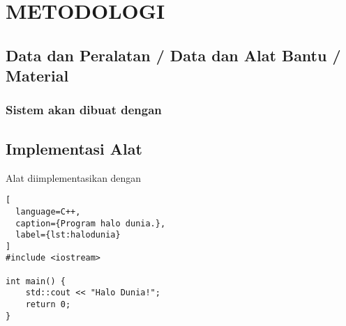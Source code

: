 \chapter{METODOLOGI}
\label{chap:desainimplementasi}



\section{Data dan Peralatan / Data dan Alat Bantu / Material}
\label{sec:perlengkapan}

\subsection{Sistem akan dibuat dengan \lipsum[1-2]}

\section{Implementasi Alat
\label{sec:implementasi alat}}

Alat diimplementasikan dengan \lipsum[1]

\begin{lstlisting}[
  language=C++,
  caption={Program halo dunia.},
  label={lst:halodunia}
]
#include <iostream>

int main() {
    std::cout << "Halo Dunia!";
    return 0;
}
\end{lstlisting}

\lipsum[2-3]



\lipsum[4]
